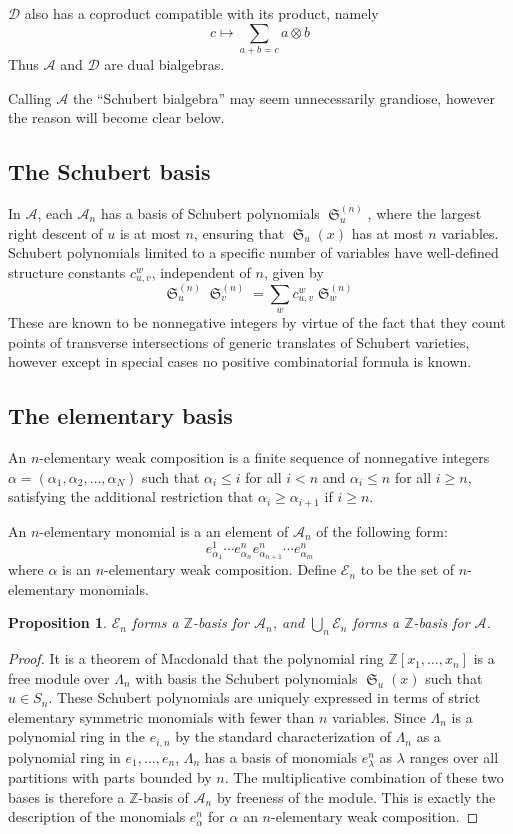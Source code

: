 \documentclass{amsart}
\newtheorem{proposition}[lemma]{Proposition}
\theoremstyle{definition}
\theoremstyle{remark}
\numberwithin{equation}{subsection}
\DeclareMathOperator{\sch}{\mathfrak{S}}
\newcommand{\coma}{\mathcal{A}}
\newcommand{\dcoma}{\mathcal{D}}
\begin{document}
$\dcoma$ also has a coproduct compatible with its product, namely
$$c\mapsto \sum_{a+b=c} a\otimes b$$
Thus $\coma$ and $\dcoma$ are dual bialgebras.

Calling $\coma$ the ``Schubert bialgebra'' may seem unnecessarily grandiose, however the reason will become clear below.

\subsection{The Schubert basis}

In $\coma$, each $\coma_n$ has a basis of Schubert polynomials $\sch_u^{(n)}$, where the largest right descent of $u$ is at most $n$, ensuring that $\sch_u(x)$ has at most $n$ variables. Schubert polynomials limited to a specific number of variables have well-defined structure constants $c_{u,v}^w$, independent of $n$, given by
$$\sch_u^{(n)}\sch_v^{(n)} = \sum_{w}c_{u,v}^w\sch_w^{(n)}$$
These are known to be nonnegative integers by virtue of the fact that they count points of transverse intersections of generic translates of Schubert varieties, however except in special cases no positive combinatorial formula is known.

\subsection{The elementary basis}

An $n$-elementary weak composition is a finite sequence of nonnegative integers $\alpha=(\alpha_1,\alpha_2,\ldots,\alpha_N)$ such that $\alpha_i\leq i$ for all $i<n$ and $\alpha_i\leq n$  for all $i\geq n$, satisfying the additional restriction that $\alpha_i\geq \alpha_{i+1}$ if $i\geq n$.

An $n$-elementary monomial is a an element of $\coma_n$ of the following form: 
$$e_{\alpha_1}^{1}\cdots e_{\alpha_n}^ne_{\alpha_{n+1}}^n\cdots e_{\alpha_m}^n$$
where $\alpha$ is an $n$-elementary weak composition. Define $\mathcal{E}_n$ to be the set of $n$-elementary monomials.

\begin{proposition}
	$\mathcal{E}_n$ forms a $\mathbb{Z}$-basis for $\coma_n$, and $\bigcup_{n}\mathcal{E}_n$ forms a $\mathbb{Z}$-basis for $\coma$.
\end{proposition}
\begin{proof}
	It is a theorem of Macdonald that the polynomial ring $\mathbb{Z}[x_1,\ldots,x_n]$ is a free module over $\Lambda_n$ with basis the Schubert polynomials $\sch_u(x)$ such that $u\in S_n$. These Schubert polynomials are uniquely expressed in terms of strict elementary symmetric monomials with fewer than $n$ variables. Since $\Lambda_n$ is a polynomial ring in the $e_{i,n}$ by the standard characterization of $\Lambda_n$ as a polynomial ring in $e_1,\ldots,e_n$, $\Lambda_n$ has a basis of monomials $e_{\lambda}^n$ as $\lambda$ ranges over all partitions with parts bounded by $n$. The multiplicative combination of these two bases is therefore a $\mathbb{Z}$-basis of $\coma_n$ by freeness of the module. This is exactly the description of the monomials $e_{\alpha}^n$ for $\alpha$ an $n$-elementary weak composition.
\end{proof}
\end{document}
